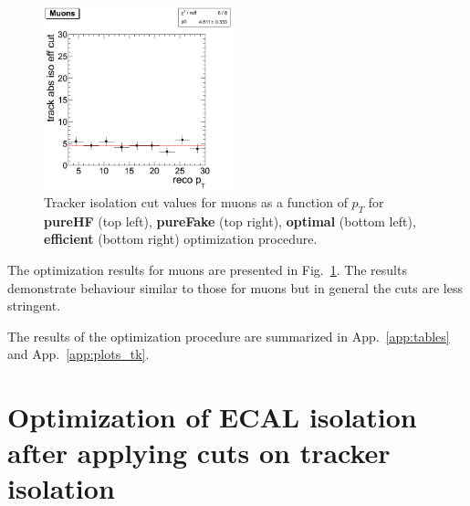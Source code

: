 \documentclass{cmspaper}
\begin{document}
\begin{figure}[htbp]
\begin{center}
   \includegraphics[width = 0.49\textwidth]{pictures/optIsoCut/trackIso_muon_eff.png}
   \caption{\small{\label{fig:optTrackIso_muon} Tracker isolation
 cut values for muons as a function of $p_T$ for {\bf pureHF} (top left), {\bf pureFake} (top right),
	{\bf optimal} (bottom left), {\bf efficient} (bottom right) optimization procedure. }}
\end{center}
\end{figure}

The optimization results for muons are presented in
Fig.~\ref{fig:optTrackIso_muon}.
The results demonstrate behaviour similar to those for muons but in general the cuts are less
stringent.

The results of the optimization procedure are summarized in App.~\ref{app:tables} and App.~\ref{app:plots_tk}.



%


\section{Optimization of ECAL isolation after applying cuts on tracker isolation}
\label{sec:caloIsoAfterTrackCut}
\end{document}
